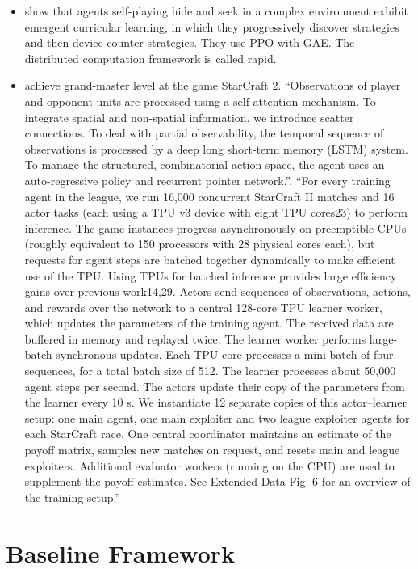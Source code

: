 \documentclass[11pt,english]{article}
\begin{document}
\begin{itemize}
\begin{itemize}
\item \citet{baker2019} show that agents self-playing hide and seek in a complex environment exhibit emergent curricular learning, in which they progressively discover strategies and then device counter-strategies. They use PPO with GAE. The distributed computation framework is called rapid. 
\item \citet{vinyals2019} achieve grand-master level at the game StarCraft 2. ``Observations of player and opponent units are processed using a self-attention mechanism. To integrate spatial and non-spatial information, we introduce scatter connections. To deal with partial observability, the temporal sequence of observations is processed by a deep long short-term memory (LSTM) system. To manage the structured, combinatorial action space, the agent uses an auto-regressive policy and recurrent
pointer network.''. ``For every training agent in the league, we run 16,000 concurrent StarCraft II matches and 16 actor tasks (each
using a TPU v3 device with eight TPU cores23) to perform inference. The game instances progress asynchronously on preemptible CPUs (roughly equivalent to 150 processors with 28 physical cores each), but requests for agent steps are batched together dynamically to make efficient use of the TPU. Using TPUs for batched inference provides large efficiency gains over previous work14,29. Actors send sequences of observations, actions, and rewards over the network to a central 128-core TPU learner
worker, which updates the parameters of the training agent. The received data are buffered in memory and replayed twice. The learner worker performs large-batch synchronous updates. Each TPU core processes a mini-batch of four sequences, for a total batch size of 512. The learner processes about 50,000 agent steps per second. The actors update their copy of the parameters from the learner every 10 s. We instantiate 12 separate copies of this actor--learner setup: one main agent, one main exploiter and two league exploiter agents for each StarCraft race. One central coordinator maintains an estimate of the payoff matrix, samples new matches on request, and resets main and league exploiters. Additional evaluator workers (running on the CPU) are used to supplement the payoff estimates. See Extended Data Fig. 6 for an overview of the training setup.''
\end{itemize}
\end{itemize}


\section{Baseline Framework}
\end{document}
